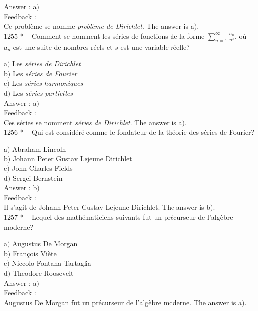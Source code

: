 \documentclass[letterpaper, 12pt]{article}
\begin{document}
Answer : a$)$\\

Feedback : \\
Ce probl\`eme se nomme {\sl probl\`eme de Dirichlet}.
The answer is a$)$.\\

1255 * -- Comment se nomment les s\'eries de fonctions de la forme
$\sum_{n=1}^{\infty}\frac{a_n}{n^s}$, o\`u $a_n$ est une suite de
nombres r\'eels et $s$ est une variable r\'eelle?

a$)$ Les {\sl s\'eries de Dirichlet} \\
b$)$ Les {\sl s\'eries de Fourier} \\
c$)$ Les {\sl s\'eries harmoniques} \\
d$)$ Les {\sl s\'eries partielles}\\

Answer : a$)$\\

Feedback : \\
Ces s\'eries se nomment {\sl s\'eries de Dirichlet}.
The answer is a$)$.\\

1256 * -- Qui est consid\'er\'e comme le fondateur de la {th\'eorie
des s\'eries de Fourier}?

a$)$ Abraham Lincoln \\
b$)$ Johann Peter Gustav Lejeune Dirichlet \\
c$)$ John Charles Fields \\
d$)$ Sergei Bernstein\\

Answer : b$)$\\

Feedback : \\
Il s'agit de Johann Peter Gustav Lejeune Dirichlet.
The answer is b$)$.\\

1257 * -- Lequel des math\'ematiciens suivants fut un pr\'ecurseur
de l'alg\`ebre moderne?

a$)$ Augustus De Morgan \\
b$)$ Fran\c cois Vi\`ete \\
c$)$ Niccolo Fontana Tartaglia\\
d$)$ Theodore Roosevelt\\

Answer : a$)$\\

Feedback : \\
Augustus De Morgan fut un pr\'ecurseur de l'alg\`ebre moderne.
The answer is a$)$.\\
\end{document}
